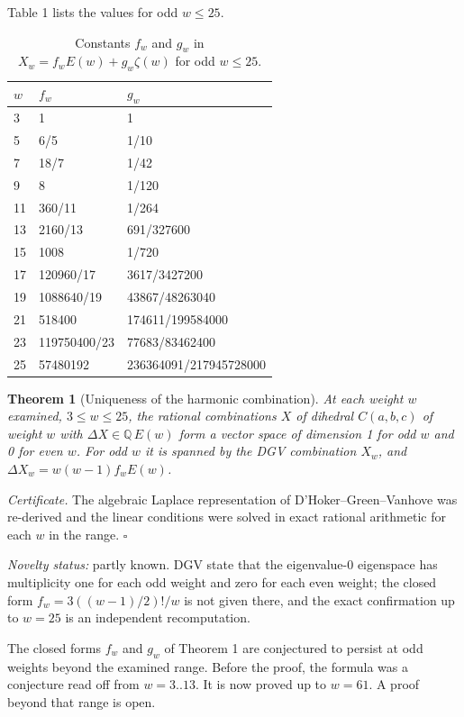 \documentclass[10pt,twocolumn]{article}
\newtheorem{theorem}{Theorem}\newtheorem{conjecture}{Conjecture}\newtheorem{proposition}{Proposition}\newtheorem{lemma}{Lemma}\newtheorem{corollary}{Corollary}
\theoremstyle{definition}\newtheorem{definition}{Definition}\newtheorem{example}{Example}
\begin{document}
Table 1 lists the values for odd \(w\le 25\).

\begin{table}[t]\centering\footnotesize
\caption{Constants \(f_w\) and \(g_w\) in \(X_w=f_wE(w)+g_w\zeta(w)\) for odd \(w\le 25\).}
\begin{tabular}{@{}lll@{}}
\toprule
\(w\) & \(f_w\) & \(g_w\) \\
\midrule
3 & 1 & 1 \\
5 & 6/5 & 1/10 \\
7 & 18/7 & 1/42 \\
9 & 8 & 1/120 \\
11 & 360/11 & 1/264 \\
13 & 2160/13 & 691/327600 \\
15 & 1008 & 1/720 \\
17 & 120960/17 & 3617/3427200 \\
19 & 1088640/19 & 43867/48263040 \\
21 & 518400 & 174611/199584000 \\
23 & 119750400/23 & 77683/83462400 \\
25 & 57480192 & 236364091/217945728000 \\
\bottomrule
\end{tabular}
\end{table}


\begin{theorem}[Uniqueness of the harmonic combination]
At each weight \(w\) examined, \(3\le w\le 25\), the rational combinations \(X\) of dihedral \(C(a,b,c)\) of weight \(w\) with \(\Delta X\in\mathbb{Q}\,E(w)\) form a vector space of dimension 1 for odd \(w\) and 0 for even \(w\). For odd \(w\) it is spanned by the DGV combination \(X_w\), and \(\Delta X_w=w(w-1)f_wE(w)\).
\end{theorem}

\emph{Certificate.} The algebraic Laplace representation of D'Hoker--Green--Vanhove was re-derived and the linear conditions were solved in exact rational arithmetic for each \(w\) in the range. \(\square\)

\emph{Novelty status:} partly known. DGV state that the eigenvalue-0 eigenspace has multiplicity one for each odd weight and zero for each even weight; the closed form \(f_w=3((w-1)/2)!/w\) is not given there, and the exact confirmation up to \(w=25\) is an independent recomputation.

\begin{remark}[Conjecture 1]
The closed forms \(f_w\) and \(g_w\) of Theorem 1 are conjectured to persist at odd weights beyond the examined range. Before the proof, the formula was a conjecture read off from \(w=3..13\). It is now proved up to \(w=61\). A proof beyond that range is open.
\end{remark}
\end{document}

